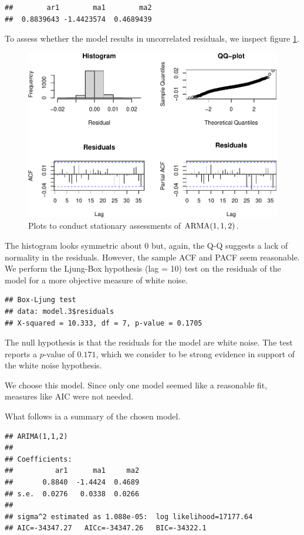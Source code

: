 \documentclass[final,
  11pt,
]{article}
\begin{document}
\begin{verbatim}
##        ar1        ma1        ma2 
##  0.8839643 -1.4423574  0.4689439
\end{verbatim}

To assess whether the model results in uncorrelated residuals, we
inspect figure \ref{fig:res1}.

\begin{figure}
\includegraphics{paper_files/figure-latex/unnamed-chunk-13-1.pdf}
\caption{Plots to conduct stationary assessments of $\operatorname{ARMA}(1,1,2)$.}
\label{fig:res1}
\end{figure}

The histogram looks symmetric about \(0\) but, again, the Q-Q suggests a
lack of normality in the residuals. However, the sample ACF and PACF
seem reasonable. We perform the Ljung-Box hypothesis (lag = 10) test on
the residuals of the model for a more objective measure of white noise.

\begin{verbatim}
## Box-Ljung test
## data: model.3$residuals
## X-squared = 10.333, df = 7, p-value = 0.1705
\end{verbatim}

The null hypothesis is that the residuals for the model are white noise.
The test reports a \(p\)-value of \(0.171\), which we consider to be
strong evidence in support of the white noise hypothesis.

We choose this model. Since only one model seemed like a reasonable fit,
measures like AIC were not needed.

What follows ia a summary of the chosen model.

\begin{verbatim}
## ARIMA(1,1,2) 
## 
## Coefficients:
##          ar1      ma1     ma2
##       0.8840  -1.4424  0.4689
## s.e.  0.0276   0.0338  0.0266
## 
## sigma^2 estimated as 1.088e-05:  log likelihood=17177.64
## AIC=-34347.27   AICc=-34347.26   BIC=-34322.1
\end{verbatim}
\end{document}
